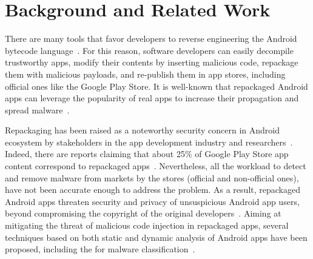 \section{Background and Related Work}\label{sec:background}


There are many tools that favor developers to reverse engineering the Android bytecode language~\cite{DBLP:conf/issta/WangGMC15}.
For this reason, software developers can easily decompile trustworthy apps, modify their contents by inserting malicious code,
repackage them with malicious payloads, and re-publish them in app stores, including official ones like the Google Play Store.
It is well-known that repackaged Android apps can leverage the popularity of real apps to increase their propagation and spread malware~\cite{DBLP:journals/tse/LiBK21}. 

Repackaging has been raised as a noteworthy security concern in Android ecosystem by stakeholders in the app development industry and researchers~\cite{DBLP:journals/ese/KhanmohammadiEH19}. Indeed, there are reports claiming that about 25\% of Google Play Store app content correspond to repackaged apps~\cite{DBLP:conf/sigmetrics/ViennotGN14}. Nevertheless, all the workload to detect and remove malware from markets by the stores (official and non-official ones), have not been accurate enough to address the problem. As a result, repackaged Android apps threaten security and privacy of unsuspicious Android app users, beyond compromising the copyright of the original developers~\cite{DBLP:journals/access/KimLCP19}. Aiming at
mitigating the threat of malicious code injection in repackaged apps,
several techniques based on both static and dynamic analysis of Android apps have been proposed,
including the \mas for malware classification~\cite{DBLP:conf/icse/JamrozikSZ16,DBLP:conf/wcre/BaoLL18}. 





